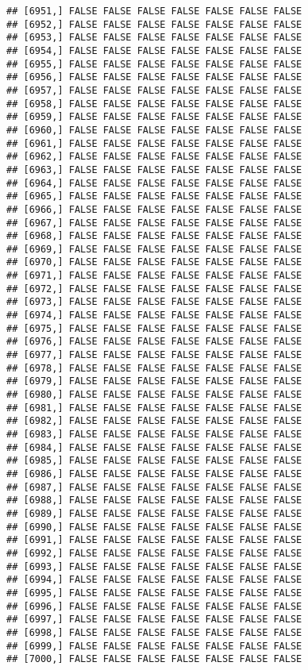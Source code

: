 \documentclass[
]{article}
\begin{document}
\begin{verbatim}
## [6951,] FALSE FALSE FALSE FALSE FALSE FALSE FALSE
## [6952,] FALSE FALSE FALSE FALSE FALSE FALSE FALSE
## [6953,] FALSE FALSE FALSE FALSE FALSE FALSE FALSE
## [6954,] FALSE FALSE FALSE FALSE FALSE FALSE FALSE
## [6955,] FALSE FALSE FALSE FALSE FALSE FALSE FALSE
## [6956,] FALSE FALSE FALSE FALSE FALSE FALSE FALSE
## [6957,] FALSE FALSE FALSE FALSE FALSE FALSE FALSE
## [6958,] FALSE FALSE FALSE FALSE FALSE FALSE FALSE
## [6959,] FALSE FALSE FALSE FALSE FALSE FALSE FALSE
## [6960,] FALSE FALSE FALSE FALSE FALSE FALSE FALSE
## [6961,] FALSE FALSE FALSE FALSE FALSE FALSE FALSE
## [6962,] FALSE FALSE FALSE FALSE FALSE FALSE FALSE
## [6963,] FALSE FALSE FALSE FALSE FALSE FALSE FALSE
## [6964,] FALSE FALSE FALSE FALSE FALSE FALSE FALSE
## [6965,] FALSE FALSE FALSE FALSE FALSE FALSE FALSE
## [6966,] FALSE FALSE FALSE FALSE FALSE FALSE FALSE
## [6967,] FALSE FALSE FALSE FALSE FALSE FALSE FALSE
## [6968,] FALSE FALSE FALSE FALSE FALSE FALSE FALSE
## [6969,] FALSE FALSE FALSE FALSE FALSE FALSE FALSE
## [6970,] FALSE FALSE FALSE FALSE FALSE FALSE FALSE
## [6971,] FALSE FALSE FALSE FALSE FALSE FALSE FALSE
## [6972,] FALSE FALSE FALSE FALSE FALSE FALSE FALSE
## [6973,] FALSE FALSE FALSE FALSE FALSE FALSE FALSE
## [6974,] FALSE FALSE FALSE FALSE FALSE FALSE FALSE
## [6975,] FALSE FALSE FALSE FALSE FALSE FALSE FALSE
## [6976,] FALSE FALSE FALSE FALSE FALSE FALSE FALSE
## [6977,] FALSE FALSE FALSE FALSE FALSE FALSE FALSE
## [6978,] FALSE FALSE FALSE FALSE FALSE FALSE FALSE
## [6979,] FALSE FALSE FALSE FALSE FALSE FALSE FALSE
## [6980,] FALSE FALSE FALSE FALSE FALSE FALSE FALSE
## [6981,] FALSE FALSE FALSE FALSE FALSE FALSE FALSE
## [6982,] FALSE FALSE FALSE FALSE FALSE FALSE FALSE
## [6983,] FALSE FALSE FALSE FALSE FALSE FALSE FALSE
## [6984,] FALSE FALSE FALSE FALSE FALSE FALSE FALSE
## [6985,] FALSE FALSE FALSE FALSE FALSE FALSE FALSE
## [6986,] FALSE FALSE FALSE FALSE FALSE FALSE FALSE
## [6987,] FALSE FALSE FALSE FALSE FALSE FALSE FALSE
## [6988,] FALSE FALSE FALSE FALSE FALSE FALSE FALSE
## [6989,] FALSE FALSE FALSE FALSE FALSE FALSE FALSE
## [6990,] FALSE FALSE FALSE FALSE FALSE FALSE FALSE
## [6991,] FALSE FALSE FALSE FALSE FALSE FALSE FALSE
## [6992,] FALSE FALSE FALSE FALSE FALSE FALSE FALSE
## [6993,] FALSE FALSE FALSE FALSE FALSE FALSE FALSE
## [6994,] FALSE FALSE FALSE FALSE FALSE FALSE FALSE
## [6995,] FALSE FALSE FALSE FALSE FALSE FALSE FALSE
## [6996,] FALSE FALSE FALSE FALSE FALSE FALSE FALSE
## [6997,] FALSE FALSE FALSE FALSE FALSE FALSE FALSE
## [6998,] FALSE FALSE FALSE FALSE FALSE FALSE FALSE
## [6999,] FALSE FALSE FALSE FALSE FALSE FALSE FALSE
## [7000,] FALSE FALSE FALSE FALSE FALSE FALSE FALSE

\end{verbatim}
\end{document}
